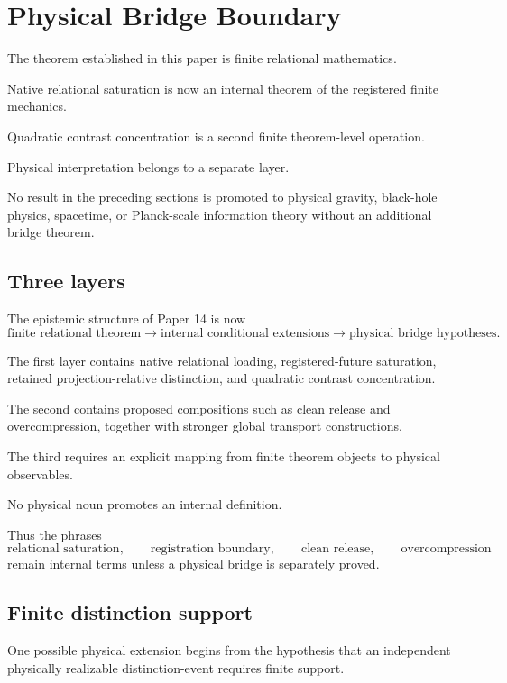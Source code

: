 \section{Physical Bridge Boundary}

The theorem established in this paper is finite relational
mathematics.

Native relational saturation is now an internal theorem of the
registered finite mechanics.

Quadratic contrast concentration is a second finite theorem-level
operation.

Physical interpretation belongs to a separate layer.

No result in the preceding sections is promoted to physical gravity,
black-hole physics, spacetime, or Planck-scale information theory
without an additional bridge theorem.

\subsection{Three layers}


The epistemic structure of Paper 14 is now
\[
\text{finite relational theorem}
\longrightarrow
\text{internal conditional extensions}
\longrightarrow
\text{physical bridge hypotheses}.
\]

The first layer contains native relational loading, registered-future
saturation, retained projection-relative distinction, and quadratic
contrast concentration.

The second contains proposed compositions such as clean release and
overcompression, together with stronger global transport
constructions.

The third requires an explicit mapping from finite theorem objects to
physical observables.

No physical noun promotes an internal definition.

Thus the phrases
\[
\text{relational saturation},
\qquad
\text{registration boundary},
\qquad
\text{clean release},
\qquad
\text{overcompression}
\]
remain internal terms unless a physical bridge is separately proved.

\subsection{Finite distinction support}

One possible physical extension begins from the hypothesis that an
independent physically realizable distinction-event requires finite
support.

